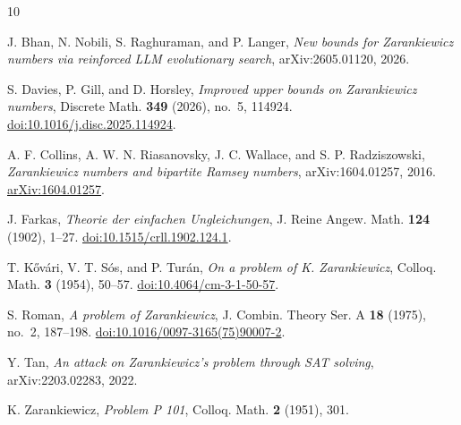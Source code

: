 \documentclass[11pt]{amsart}
\begin{document}
\sloppy\raggedright
\begin{thebibliography}{10}

J. Bhan, N. Nobili, S. Raghuraman, and P. Langer,
\emph{New bounds for Zarankiewicz numbers via reinforced LLM evolutionary search},
arXiv:2605.01120, 2026.

S. Davies, P. Gill, and D. Horsley,
\emph{Improved upper bounds on Zarankiewicz numbers},
Discrete Math. \textbf{349} (2026), no.~5, 114924.
\href{https://doi.org/10.1016/j.disc.2025.114924}{doi:10.1016/j.disc.2025.114924}.

A. F. Collins, A. W. N. Riasanovsky, J. C. Wallace, and S. P. Radziszowski,
\emph{Zarankiewicz numbers and bipartite Ramsey numbers},
arXiv:1604.01257, 2016.
\href{https://arxiv.org/abs/1604.01257}{arXiv:1604.01257}.

J. Farkas,
\emph{Theorie der einfachen Ungleichungen},
J. Reine Angew. Math. \textbf{124} (1902), 1--27.
\href{https://doi.org/10.1515/crll.1902.124.1}{doi:10.1515/crll.1902.124.1}.

T. K\H{o}v\'ari, V. T. S\'os, and P. Tur\'an,
\emph{On a problem of K. Zarankiewicz},
Colloq. Math. \textbf{3} (1954), 50--57.
\href{https://doi.org/10.4064/cm-3-1-50-57}{doi:10.4064/cm-3-1-50-57}.

S. Roman,
\emph{A problem of Zarankiewicz},
J. Combin. Theory Ser. A \textbf{18} (1975), no.~2, 187--198.
\href{https://doi.org/10.1016/0097-3165(75)90007-2}{doi:10.1016/0097-3165(75)90007-2}.

Y. Tan,
\emph{An attack on Zarankiewicz's problem through SAT solving},
arXiv:2203.02283, 2022.

K. Zarankiewicz,
\emph{Problem P 101},
Colloq. Math. \textbf{2} (1951), 301.

\end{thebibliography}
\fussy
\end{document}
